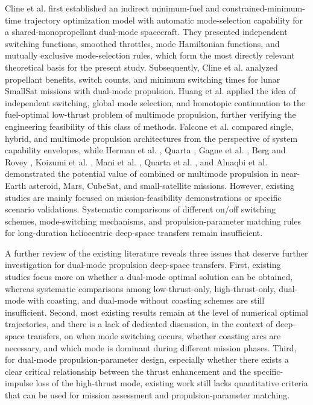 ﻿\documentclass{IEEEtaes}
\begin{document}
Cline et al. \cite{cline2024a} first established an indirect minimum-fuel and constrained-minimum-time trajectory optimization model with automatic mode-selection capability for a shared-monopropellant dual-mode spacecraft. They presented independent switching functions, smoothed throttles, mode Hamiltonian functions, and mutually exclusive mode-selection rules, which form the most directly relevant theoretical basis for the present study. Subsequently, Cline et al. \cite{cline2024b} analyzed propellant benefits, switch counts, and minimum switching times for lunar SmallSat missions with dual-mode propulsion. Huang et al. \cite{huang2026} applied the idea of independent switching, global mode selection, and homotopic continuation to the fuel-optimal low-thrust problem of multimode propulsion, further verifying the engineering feasibility of this class of methods. Falcone et al. \cite{falcone2025} compared single, hybrid, and multimode propulsion architectures from the perspective of system capability envelopes, while Herman et al. \cite{herman2014}, Quarta \cite{quarta2024}, Gagne et al. \cite{gagne2018}, Berg and Rovey \cite{berg2017}, Koizumi et al. \cite{koizumi2016}, Mani et al. \cite{mani2019}, Quarta et al. \cite{quarta2025}, and Alnaqbi et al. \cite{alnaqbi2024} demonstrated the potential value of combined or multimode propulsion in near-Earth asteroid, Mars, CubeSat, and small-satellite missions. However, existing studies are mainly focused on mission-feasibility demonstrations or specific scenario validations. Systematic comparisons of different on/off switching schemes, mode-switching mechanisms, and propulsion-parameter matching rules for long-duration heliocentric deep-space transfers remain insufficient.

A further review of the existing literature reveals three issues that deserve further investigation for dual-mode propulsion deep-space transfers. First, existing studies focus more on whether a dual-mode optimal solution can be obtained, whereas systematic comparisons among low-thrust-only, high-thrust-only, dual-mode with coasting, and dual-mode without coasting schemes are still insufficient. Second, most existing results remain at the level of numerical optimal trajectories, and there is a lack of dedicated discussion, in the context of deep-space transfers, on when mode switching occurs, whether coasting arcs are necessary, and which mode is dominant during different mission phases. Third, for dual-mode propulsion-parameter design, especially whether there exists a clear critical relationship between the thrust enhancement and the specific-impulse loss of the high-thrust mode, existing work still lacks quantitative criteria that can be used for mission assessment and propulsion-parameter matching.
\end{document}
